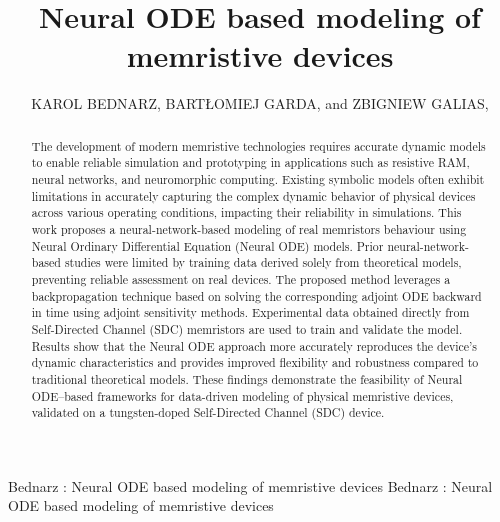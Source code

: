 \documentclass{ieeeaccess}
\begin{document}

\title{Neural ODE based modeling of memristive devices}
\author{\uppercase{Karol Bednarz},
\uppercase{Bartłomiej Garda}, and
\uppercase{Zbigniew Galias},
}

\address[1]{Department of Electrical and Power Engineering, AGH University of Krak\'ow,
al. Mickiewicza 30, 30--059, Krak\'ow, Poland%
}

\markboth
{Bednarz \headeretal: Neural ODE based modeling of memristive devices}
{Bednarz \headeretal: Neural ODE based modeling of memristive devices}



\begin{abstract}
  The development of modern memristive technologies requires accurate dynamic models to enable reliable simulation and prototyping in applications such as resistive RAM, neural networks, and neuromorphic computing. Existing symbolic models often exhibit limitations in accurately capturing the complex dynamic behavior of physical devices across various operating conditions, impacting their reliability in simulations. This work proposes a neural-network-based modeling of real memristors behaviour using Neural Ordinary Differential Equation (Neural ODE) models. Prior neural-network-based studies were limited by training data derived solely from theoretical models, preventing reliable assessment on real devices. The proposed method leverages a backpropagation technique based on solving the corresponding adjoint ODE backward in time using adjoint sensitivity methods. Experimental data obtained directly from Self-Directed Channel (SDC) memristors are used to train and validate the model. Results show that the Neural ODE approach more accurately reproduces the device’s dynamic characteristics and provides improved flexibility and robustness compared to traditional theoretical models. These findings demonstrate the feasibility of Neural ODE–based frameworks for data-driven modeling of physical memristive devices, validated on a  tungsten-doped Self-Directed Channel (SDC) device.
\end{abstract}
\end{document}
